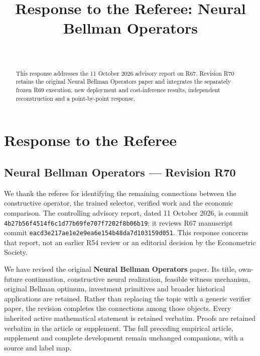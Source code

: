 \documentclass[ecta,nameyear,draft]{econsocart}
\begin{document}
\begin{frontmatter}
\title{Response to the Referee: Neural Bellman Operators}
\begin{aug}
\author[id=au1,addressref={add1}]{~}
\address[id=add1]{Peking University}
\end{aug}
\begin{abstract}This response addresses the 11 October 2026 advisory report on R67. Revision R70 retains the original Neural Bellman Operators paper and integrates the separately frozen R69 execution, new deployment and cost-inference results, independent reconstruction and a point-by-point response.\end{abstract}
\end{frontmatter}
\providecommand{\tightlist}{\setlength{\itemsep}{0pt}\setlength{\parskip}{0pt}}
\hypertarget{response-to-the-referee}{%
\section{Response to the Referee}\label{response-to-the-referee}}

\hypertarget{neural-bellman-operators-revision-r70}{%
\subsection{Neural Bellman Operators --- Revision
R70}\label{neural-bellman-operators-revision-r70}}

We thank the referee for identifying the remaining connections between
the constructive operator, the trained selector, verified work and the
economic comparison. The controlling advisory report, dated 11 October
2026, is commit \nolinkurl{4b27b56f4514f6c1d77b69fe707f7202f8b06b19}; it
reviews R67 manuscript commit
\nolinkurl{eacd3e217ae1e2e9ea6e154b48da7d103159d051}. This response
concerns that report, not an earlier R54 review or an editorial decision
by the Econometric Society.

We have revised the original \textbf{Neural Bellman Operators} paper.
Its title, own-future continuation, constructive neural realization,
feasible witness mechanism, original Bellman optimum, investment
primitives and broader historical applications are retained. Rather than
replacing the topic with a generic verifier paper, the revision
completes the connections among those objects. Every inherited active
mathematical statement is retained verbatim. Proofs are retained
verbatim in the article or supplement. The full preceding empirical
article, supplement and complete development remain unchanged
companions, with a source and label map.
\end{document}
